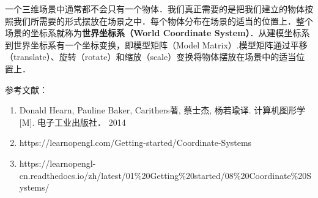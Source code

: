 

一个三维场景中通常都不会只有一个物体．我们真正需要的是把我们建立的物体按照我们所需要的形式摆放在场景之中．每个物体分布在场景的适当的位置上．整个场景的坐标系就称为\textbf{世界坐标系（World Coordinate System）}．从建模坐标系到世界坐标系有一个坐标变换，即模型矩阵（Model Matrix）.模型矩阵通过平移（translate）、旋转（rotate）和缩放（scale）变换将物体摆放在场景中的适当位置上．




参考文献：
\begin{enumerate}
\item Donald Hearn, Pauline Baker, Carithers著, 蔡士杰, 杨若瑜译. 计算机图形学[M]. 电子工业出版社． 2014
\item https://learnopengl.com/Getting-started/Coordinate-Systems
\item https://learnopengl-cn.readthedocs.io/zh/latest/01\%20Getting\%20started/08\%20Coordinate\%20Systems/
\end{enumerate}